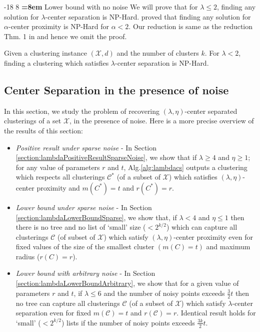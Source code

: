 \documentclass[orivec]{llncs}
\makeatletter
\newcommand{\mc}{\mathcal}
\renewcommand\subsubsection{\@startsection{subsubsection}{3}{\z@}%
   {-18\p@ \@plus -4\p@ \@minus -4\p@}%
   {8\p@ \@plus 4\p@ \@minus 4\p@}%
   {\normalfont\normalsize\bfseries\boldmath
   \rightskip=\z@ \@plus 8em \pretolerance=10000}}
\makeatother
\begin{document}

\subsubsection{Lower bound with no noise}
\label{section:lowerBdNoNoiseLambda}
We will prove that for $\lambda \le 2$, finding any solution for $\lambda$-center separation is NP-Hard. \cite{reyzin2012data} proved that finding any solution for $\alpha$-center proximity is NP-Hard for $\alpha < 2$. Our reduction is same as the reduction Thm. 1 in \cite{reyzin2012data} and hence we omit the proof.

\begin{theorem}
\label{thm:lambdaNoNoiseLowerBd}
Given a clustering instance $(\mc X, d)$ and the number of clusters $k$. For $\lambda < 2$, finding a clustering which satisfies $\lambda$-center separation is NP-Hard.
\end{theorem}


\subsection{Center Separation in the presence of noise}
\label{sec:cswith}
In this section, we study the problem of recovering $(\lambda, \eta)$-center separated clusterings of a set $\mc X$, in the presence of noise. Here is a more precise overview of the results of this section:
\begin{itemize}[nolistsep,noitemsep,leftmargin=*]
\item  {\it Positive result under sparse noise} - In Section \ref{section:lambdaPositiveResultSparseNoise}, we show that if $\lambda \ge 4$ and $\eta \ge 1$; for any value of parameters $r$ and $t$, Alg.\ref{alg:lambdacs} outputs a clustering which respects all clusterings $\mc C^*$ (of a subset of $\mc X$) which satisfies $(\lambda, \eta)$-center proximity and $m(C^*)=t$ and $r(C^*) = r$.
\item  {\it Lower bound under sparse noise} - In Section \ref{section:lambdaLowerBoundSparse}, we show that, if $\lambda < 4$ and $\eta \le 1$ then there is no tree and no list of `small' size ($<2^{k/2}$) which can capture all clusterings $\mc C$ (of subset of $\mc X$) which satisfy $(\lambda, \eta)$-center proximity even for fixed values of the size of the smallest cluster $(m(C) = t)$ and maximum radius ($r(C) = r$).
\item {\it Lower bound with arbitrary noise} - In Section \ref{section:lambdaLowerBoundArbitrary}, we show that for a given value of parameters $r$ and $t$, if $\lambda \le 6$ and the number of noisy points exceeds $\frac{3}{2}t$ then no tree can capture all clusterings $\mc C$ (of a subset of $\mc X$) which satisfy $\lambda$-center separation even for fixed $m(\mc C) = t$ and $r(\mc C) = r$. Identical result holds for `small' ($<2^{k/2}$) lists if the number of noisy points exceeds $\frac{3k}{2}t$.
\end{itemize}
\end{document}
